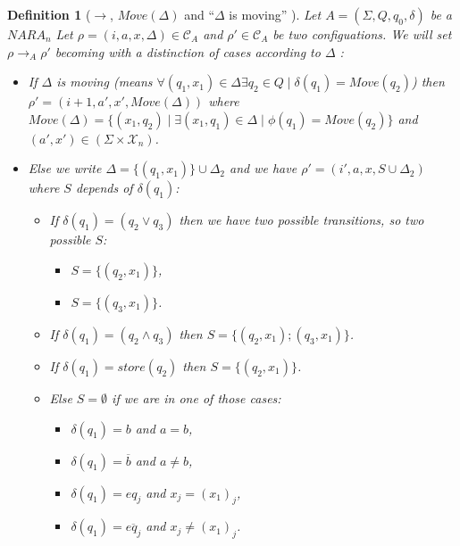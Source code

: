 \documentclass[a4paper,10pt]{report}
\newtheorem{df}{Definition}
\newcommand{\C}{\mathcal{C}_{A}}
\newcommand{\X}{\mathcal{X}_{n}}
\begin{document}
\begin{df}[$\rightarrow$, $Move(\Delta)$ and ``$\Delta$ is moving'' ]
  Let $A = (\Sigma ,Q ,q_0, \delta )$ be a $NARA_n$
  Let $\rho = (i, a,x,\Delta) \in \C$ and $\rho' \in \C$ be two configuations.
  We will set  $\rho \rightarrow_A \rho'$  becoming with a distinction of cases according to $\Delta$ : 
   \begin{itemize}
    \item [${\xrightarrow{(a',x')}}_M$ (move)] If $\Delta$ is moving (means $\forall (q_1,x_1) \in \Delta \exists q_2 \in Q \mid \delta(q_1) = Move(q_2)$)
    then $\rho'  = (i+1,a',x',Move(\Delta))$ 
    where $Move(\Delta) = \{(x_1,q_2) \mid \exists (x_1,q_1) \in \Delta \mid \phi(q_1) = Move(q_2)\}$ and $(a',x') \in (\Sigma \times \X)$.

    \item [$\rightarrow_{\epsilon}$ (epsilon)  ] Else we write $\Delta = \{(q_1,x_1)\} \cup \Delta_2$ and we have  $\rho' = (i',a,x,S \cup \Delta_2 )$ where $S$ depends of $\delta(q_1)$:  
    \begin{itemize}
    \item [$\rightarrow_\vee$ (or)] If $\delta(q_1) = (q_2 \vee q_3)$  then we have two possible transitions, so two possible $S$:
      \begin{itemize}
	\item $S = \{ (q_2,x_1)\}$,   
	\item $S = \{(q_3,x_1) \}$.
      \end{itemize}
    \item [$\rightarrow_\wedge$ (and)] If $\delta(q_1) = (q_2 \wedge q_3)$  then $S = \{(q_2,x_1); (q_3,x_1) \} $.
    \item [$\rightarrow_s$ (store)] If $\delta(q_1) = store(q_2)$  then $S =  \{(q_2,x_1)\}$.
 
    \item [$\rightarrow_c$ (check)] Else $S = \emptyset$ if we are in one of those cases:  
	\begin{itemize}
 	 \item $\delta(q_1) = b$ and $ a= b$,
 	 \item $\delta(q_1) = \overline b$ and $ a \neq b$,
 	 \item $\delta(q_1) = eq_j$ and $x_j = {(x_1)}_j$,
 	 \item $\delta(q_1) = \overline{eq_j}$ and $x_j \neq {(x_1)}_j$.
	\end{itemize}
    \end{itemize}
   

    
   \end{itemize}


\end{df}
\end{document}
